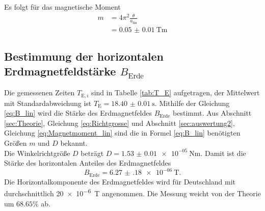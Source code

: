 Es folgt für das magnetische Moment
\begin{align}
	m 	&= 4\pi^2\frac{\theta}{a_\text{lin}}\\
		&= \SI{0.05(1)}{\tesla\meter}
	\label{eq:Magnetmoment_lin}
\end{align}
\subsection{Bestimmung der horizontalen \texorpdfstring{Erdmagnetfeldstärke $B_\text{Erde}$}{Magnetfeldstärke B der Erde}}
\label{sec:auswertung3}

Die gemessenen Zeiten $T_{\text{E},i}$ sind in Tabelle \ref{tab:T_E} aufgetragen, der Mittelwert mit Standardabweichung ist
$T_\text{E}=\SI{18.40(1)}{\second}$.
Mithilfe der Gleichung \eqref{eq:B_lin} wird die Stärke des Erdmagnetfeldes $B_\text{Erde}$ bestimmt.
Aus Abschnitt \ref{sec:Theorie}, Gleichung \eqref{eq:Richtgrosse} und Abschnitt \ref{sec:auswertung2}, Gleichung \eqref{eq:Magnetmoment_lin} sind die in Formel \eqref{eq:B_lin} benötigten Größen $m$ und $D$ bekannt.\\
Die Winkelrichtgröße $D$ beträgt
$D = \SI{1.53(1)e-05}{\newton\meter}$.
Damit ist die Stärke des horizontalen Anteiles des Erdmagnetfeldes
\begin{equation}
	B_\text{Erde}=\SI{6.27(18)e-06}{\tesla}.
\end{equation}
Die Horizontalkomponente des Erdmagnetfeldes wird für Deutschland mit durchschnittlich \SI{20e-6}{\tesla} \cite{lausitz} angenommen.
Die Messung weicht von der Theorie um $68.65\%$ ab.

